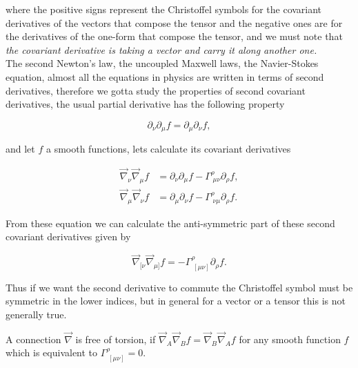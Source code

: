         where the positive signs represent the Christoffel symbols for the covariant derivatives of the vectors that compose the tensor and the negative ones are for the derivatives of the one-form that compose the tensor, and we must note that \textit{the covariant derivative is taking a vector and carry it along another one.}\\

        The second Newton's law, the uncoupled Maxwell laws, the Navier-Stokes equation, almost all the equations in physics are written in terms of second derivatives, therefore we gotta study the properties of second covariant derivatives, the usual partial derivative has the following property

        \begin{equation}
            \partial_{\nu}\partial_{\mu}f = \partial_{\mu}\partial_{\nu}f,
        \end{equation}

        and let $f$ a smooth functions, lets calculate its covariant derivatives

        \begin{align}
            \Vec{\nabla}_{\nu}\Vec{\nabla}_{\mu}f &= \partial_{\nu}\partial_{\mu}f - \Gamma^{\rho}_{\;\mu\nu}\partial_{\rho}f,\\
            \Vec{\nabla}_{\mu}\Vec{\nabla}_{\nu}f &= \partial_{\mu}\partial_{\nu}f - \Gamma^{\rho}_{\;\nu\mu}\partial_{\rho}f.
        \end{align}

        From these equation we can calculate the anti-symmetric part of these second covariant derivatives given by

        \begin{equation}
            \Vec{\nabla}_{[\nu}\Vec{\nabla}_{\mu]}f = - \Gamma^{\rho}_{\;[\mu\nu]}\partial_{\rho}f.
        \end{equation}

        Thus if we want the second derivative to commute the Christoffel symbol must be symmetric in the lower indices, but in general for a vector or a tensor this is not generally true.

        \begin{myDef}
            A connection $\Vec{\nabla}$ is free of torsion, if $\Vec{\nabla}_A\Vec{\nabla}_Bf = \Vec{\nabla}_B\Vec{\nabla}_Af$ for any smooth function $f$ which is equivalent to $\Gamma^{\rho}_{\;[\mu\nu]}=0$.
        \end{myDef}

